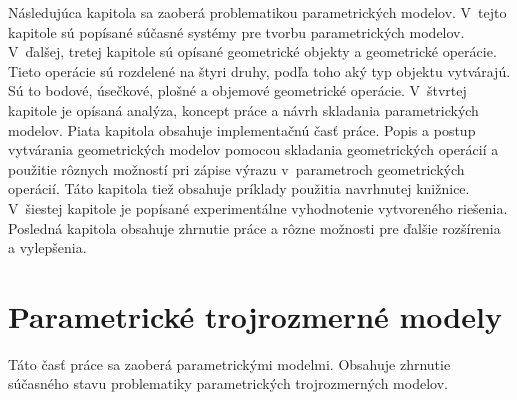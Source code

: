 

Následujúca kapitola sa zaoberá problematikou parametrických modelov.
V~tejto kapitole sú popísané súčasné systémy pre tvorbu parametrických modelov.
V~ďalšej, tretej kapitole sú opísané geometrické objekty a geometrické operácie. Tieto operácie sú rozdelené na štyri druhy, podľa toho aký typ objektu vytvárajú. Sú to bodové, úsečkové, plošné a objemové geometrické operácie. 
V~štvrtej kapitole je opísaná analýza, koncept práce a návrh skladania parametrických modelov.
Piata kapitola obsahuje implementačnú časť práce. Popis a postup vytvárania geometrických modelov pomocou skladania geometrických operácií a použitie rôznych možností pri zápise výrazu v~parametroch geometrických operácií. Táto kapitola tiež obsahuje príklady použitia navrhnutej knižnice.
V~šiestej kapitole je popísané experimentálne vyhodnotenie vytvoreného riešenia.
Posledná kapitola obsahuje zhrnutie práce a rôzne možnosti pre ďalšie rozšírenia a vylepšenia.

\chapter{Parametrické trojrozmerné modely}
Táto časť práce sa zaoberá parametrickými modelmi. Obsahuje zhrnutie súčasného stavu problematiky parametrických trojrozmerných modelov.

